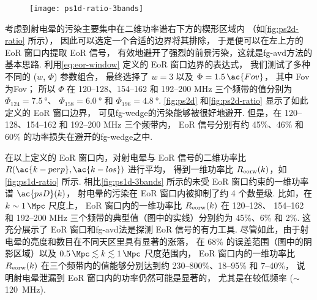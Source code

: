 \begin{figure}[htp]
  \centering
  \texttt{[image: ps1d-ratio-3bands]}
  \label{fig:ps1d-ratio}
\end{figure}

考虑到射电晕的污染主要集中在二维功率谱右下方的楔形区域内
（如\autoref{fig:ps2d-ratio} 所示），
因此可以选定一个合适的边界将其排除，
于是便可以在左上方的 EoR 窗口内提取 EoR 信号，
有效地避开了强烈的前景污染，这就是\ac{fg-avd}方法的基本思路.
利用\autoref{eq:eor-window} 定义的 EoR 窗口边界的表达式，
我们测试了多种不同的 ($w$, $\Phi$) 参数组合，
最终选择了 $w = 3$ 以及 $\Phi = 1.5\,\ac{Fov}$，
其中 \ac{Fov} 为\acl{Fov}；
所以 $\Phi$ 在 \numrange{120}{128}、\numrange{154}{162}
和 \numrange{192}{200} \si{\MHz} 三个频带的值分别为
$\Phi_{124} = \SI{7.5}{\degree}$、
$\Phi_{158} = \SI{6.0}{\degree}$ 和
$\Phi_{196} = \SI{4.8}{\degree}$.
\autoref{fig:ps2d} 和\autoref{fig:ps2d-ratio} 显示了如此定义的 EoR 窗口边界，
可见\ac{fg-wedge}的污染能够被很好地避开.
但是，在 \numrange{120}{128}、\numrange{154}{162}
和 \numrange{192}{200} \si{\MHz} 三个频带内，
EoR 信号分别有约 45\%、46\% 和 60\% 的功率损失在避开的\ac{fg-wedge}之中.

在以上定义的 EoR 窗口内，对射电晕与 EoR 信号的二维功率比 
$R(\ac{k-perp}, \ac{k-los})$ 进行平均，
得到一维功率比 $R_{\mathrm{eorw}}(k)$，如\autoref{fig:ps1d-ratio} 所示.
相比\autoref{fig:ps1d-3bands} 所示的未受 EoR 窗口约束的一维功率谱 $\ac{psD}(k)$，
射电晕的污染在 EoR 窗口内被抑制了约 4 个数量级.
比如，在 $k \sim \SI{1}{\per\Mpc}$ 尺度上，
EoR 窗口内的一维功率比 $R_{\mathrm{eorw}}(k)$ 在 \numrange{120}{128}、
\numrange{154}{162} 和 \numrange{192}{200} \si{\MHz}
三个频带的典型值（图中的实线）分别约为 45\%、6\% 和 2\%.
这充分展示了 EoR 窗口和\ac{fg-avd}法是探测 EoR 信号的有力工具.
尽管如此，由于射电晕的亮度和数目在不同天区里具有显著的涨落，
在 68\% 的误差范围（图中的阴影区域）以及
$\SI{0.5}{\per\Mpc} \lesssim k \lesssim \SI{1}{\per\Mpc}$ 尺度范围内，
EoR 窗口内的一维功率比 $R_{\mathrm{eorw}}(k)$ 在三个频带内的值能够分别达到约
\numrange{230}{800}\%、\numrange{18}{95}\% 和 \numrange{7}{40}\%，
说明射电晕泄漏到 EoR 窗口内的功率仍然可能是显著的，
尤其是在较低频率 ($\sim$\,\SI{120}{\MHz}).

